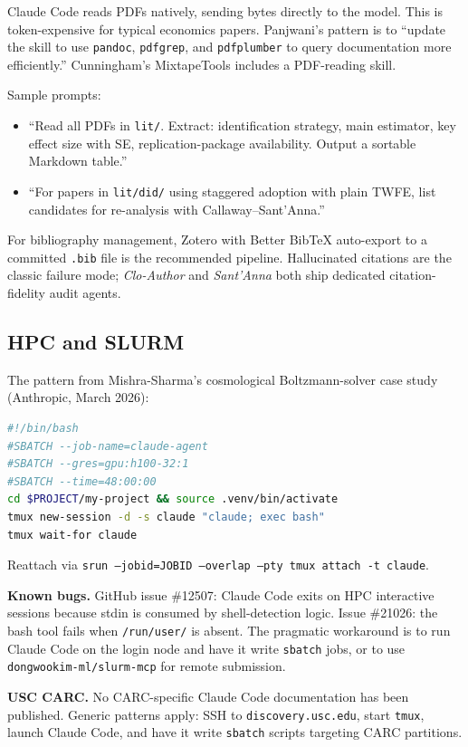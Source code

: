 \documentclass[11pt]{article}
\begin{document}
Claude Code reads PDFs natively, sending bytes directly to the model. This is token-expensive for typical economics papers. Panjwani's pattern is to ``update the skill to use \texttt{pandoc}, \texttt{pdfgrep}, and \texttt{pdfplumber} to query documentation more efficiently.'' Cunningham's MixtapeTools includes a PDF-reading skill.

Sample prompts:
\begin{itemize}[leftmargin=*,nosep]
    \item ``Read all PDFs in \texttt{lit/}. Extract: identification strategy, main estimator, key effect size with SE, replication-package availability. Output a sortable Markdown table.''
    \item ``For papers in \texttt{lit/did/} using staggered adoption with plain TWFE, list candidates for re-analysis with Callaway--Sant'Anna.''
\end{itemize}

For bibliography management, Zotero with Better BibTeX auto-export to a committed \texttt{.bib} file is the recommended pipeline. Hallucinated citations are the classic failure mode; \emph{Clo-Author} and \emph{Sant'Anna} both ship dedicated citation-fidelity audit agents.


\subsection{HPC and SLURM}

The pattern from Mishra-Sharma's cosmological Boltzmann-solver case study (Anthropic, March 2026):

\begin{lstlisting}[language=bash]
#!/bin/bash
#SBATCH --job-name=claude-agent
#SBATCH --gres=gpu:h100-32:1
#SBATCH --time=48:00:00
cd $PROJECT/my-project && source .venv/bin/activate
tmux new-session -d -s claude "claude; exec bash"
tmux wait-for claude
\end{lstlisting}

Reattach via \texttt{srun --jobid=JOBID --overlap --pty tmux attach -t claude}.

\textbf{Known bugs.} GitHub issue \#12507: Claude Code exits on HPC interactive sessions because stdin is consumed by shell-detection logic. Issue \#21026: the bash tool fails when \texttt{/run/user/} is absent. The pragmatic workaround is to run Claude Code on the login node and have it write \texttt{sbatch} jobs, or to use \texttt{dongwookim-ml/slurm-mcp} for remote submission.

\textbf{USC CARC.} No CARC-specific Claude Code documentation has been published. Generic patterns apply: SSH to \texttt{discovery.usc.edu}, start \texttt{tmux}, launch Claude Code, and have it write \texttt{sbatch} scripts targeting CARC partitions.
\end{document}
